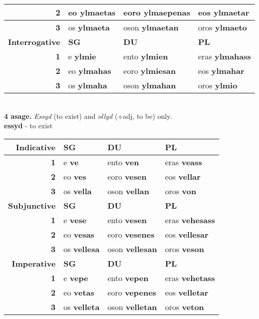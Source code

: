\begin{center}
\begin{tabular}{|r|l|l|l|}
    \textbf{2} & eo \textbf{ylmaetas} & eoro \textbf{ylmaepenas} & eos \textbf{ylmaetar} \\ \hline
    \textbf{3} & os \textbf{ylmaeta} & oson \textbf{ylmaetan} & oros \textbf{ylmaeto} \\ \hline
    \textbf{Interrogative} & \textbf{SG} & \textbf{DU} & \textbf{PL} \\ \hline
    \textbf{1} & e \textbf{ylmie} & ento \textbf{ylmien} & eras \textbf{ylmahass} \\ \hline
    \textbf{2} & eo \textbf{ylmahas} & eoro \textbf{ylmiesan} & eos \textbf{ylmahar} \\ \hline
    \textbf{3} & os \textbf{ylmaha} & oson \textbf{ylmahan} & oros \textbf{ylmio} \\ \hline
  \end{tabular} \\
  \pagebreak
  \textbf{4 asage.} \emph{Essyd} (to exist) and \emph{ollyd} (+adj, to be) only. \\
  \textbf{essyd} - to exist \\
  \begin{tabular}{|r|l|l|l|}
    \hline
    \textbf{Indicative} & \textbf{SG} & \textbf{DU} & \textbf{PL} \\ \hline
    \textbf{1} & e \textbf{ve} & ento \textbf{ven} & eras \textbf{veass} \\ \hline
    \textbf{2} & eo \textbf{ves} & eoro \textbf{vesen} & eos \textbf{vellar} \\ \hline
    \textbf{3} & os \textbf{vella} & oson \textbf{vellan} & oros \textbf{von} \\ \hline
    \textbf{Subjunctive} & \textbf{SG} & \textbf{DU} & \textbf{PL} \\ \hline
    \textbf{1} & e \textbf{vese} & ento \textbf{vesen} & eras \textbf{vehesass} \\ \hline
    \textbf{2} & eo \textbf{vesas} & eoro \textbf{vesenes} & eos \textbf{vellesar} \\ \hline
    \textbf{3} & os \textbf{vellesa} & oson \textbf{vellesan} & oros \textbf{veson} \\ \hline
    \textbf{Imperative} & \textbf{SG} & \textbf{DU} & \textbf{PL} \\ \hline
    \textbf{1} & e \textbf{vepe} & ento \textbf{vepen} & eras \textbf{vehetass} \\ \hline
    \textbf{2} & eo \textbf{vetas} & eoro \textbf{vepenes} & eos \textbf{velletar} \\ \hline
    \textbf{3} & os \textbf{velleta} & oson \textbf{velletan} & oros \textbf{veton} \\ \hline

\end{tabular}
\end{center}
